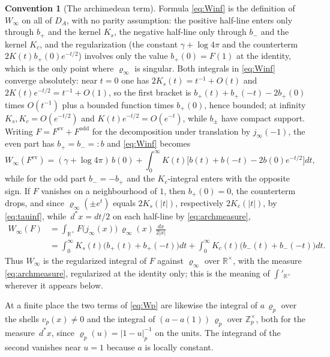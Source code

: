 \documentclass[11pt]{amsart}
\theoremstyle{definition}
\newtheorem{convention}[theorem]{Convention}
\theoremstyle{remark}
\newcommand{\R}{\mathbb R}
\newcommand{\Z}{\mathbb Z}
\newcommand{\dstar}{\,d^{*}}
\newcommand{\DA}{D_A}
\begin{document}
\begin{convention}[The archimedean term]\label{conv:Winf}
Formula \eqref{eq:Winf} is the definition of $W_{\infty}$ on all of $\DA$,
with no parity assumption: the positive half-line enters only through $b_{+}$
and the kernel $K_{s}$, the negative half-line only through $b_{-}$ and the
kernel $K_{c}$, and the regularization (the constant $\gamma+\log4\pi$ and the
counterterm $2K(t)b_{+}(0)e^{-t/2}$) involves only the value $b_{+}(0)=F(1)$ at
the identity, which is the only point where $\varrho_{\infty}$ is singular.  Both
integrals in \eqref{eq:Winf} converge absolutely: near $t=0$ one has
$2K_{s}(t)=t^{-1}+O(t)$ and $2K(t)e^{-t/2}=t^{-1}+O(1)$, so the first bracket is
$b_{+}(t)+b_{+}(-t)-2b_{+}(0)$ times $O(t^{-1})$ plus a bounded function times
$b_{+}(0)$, hence bounded; at infinity $K_{s},K_{c}=O(e^{-t/2})$ and
$K(t)e^{-t/2}=O(e^{-t})$, while $b_{\pm}$ have compact support.  Writing
$F=F^{\mathrm{ev}}+F^{\mathrm{odd}}$ for the decomposition under translation by
$j_{\infty}(-1)$, the even part has $b_{+}=b_{-}=:b$ and \eqref{eq:Winf}
becomes
\begin{equation}\label{eq:Winfeven}
W_{\infty}(F^{\mathrm{ev}})=(\gamma+\log4\pi)\,b(0)
+\int_0^{\infty}K(t)\bigl[b(t)+b(-t)-2b(0)e^{-t/2}\bigr]dt,
\end{equation}
while for the odd part $b_{-}=-b_{+}$ and the $K_{c}$-integral enters with the
opposite sign.  If $F$ vanishes on a neighbourhood of $1$, then $b_{+}(0)=0$,
the counterterm drops, and since $\varrho_{\infty}(\pm e^{t})$ equals
$2K_{s}(|t|)$, respectively $2K_{c}(|t|)$, by \eqref{eq:tauinf}, while
$\dstar x=dt/2$ on each half-line by \eqref{eq:archmeasure},
\begin{equation}\label{eq:Winfint}
\begin{aligned}
W_{\infty}(F)&=\int_{\R^{\times}}F\bigl(j_{\infty}(x)\bigr)\,\varrho_{\infty}(x)\,
\frac{dx}{2|x|}\\
&=\int_0^{\infty}K_{s}(t)\bigl(b_{+}(t)+b_{+}(-t)\bigr)dt
+\int_0^{\infty}K_{c}(t)\bigl(b_{-}(t)+b_{-}(-t)\bigr)dt .
\end{aligned}
\end{equation}
Thus $W_{\infty}$ is the regularized integral of $F$ against $\varrho_{\infty}$
over $\R^{\times}$, with the measure \eqref{eq:archmeasure}, regularized at the
identity only; this is the meaning of $\int'_{\R^{\times}}$ wherever it
appears below.
\end{convention}

At a finite place the two terms of \eqref{eq:Wp} are likewise the integral of
$a\,\varrho_p$ over the shells $v_p(x)\ne0$ and the integral of
$(a-a(1))\,\varrho_p$ over $\Z_p^{\times}$, both for the measure $\dstar x$, since
$\varrho_p(u)=|1-u|_p^{-1}$ on the units.  The integrand of the second vanishes
near $u=1$ because $a$ is locally constant.
\end{document}
